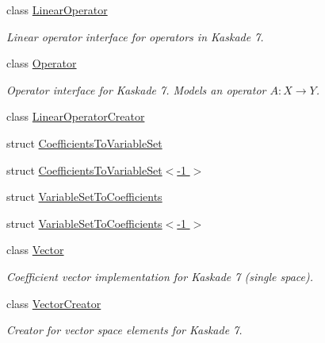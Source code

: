 \begin{DoxyCompactItemize}
class \hyperlink{classSpacy_1_1Kaskade_1_1LinearOperator}{\-Linear\-Operator}
\begin{DoxyCompactList}\small\item\em \-Linear operator interface for operators in \-Kaskade 7. \end{DoxyCompactList}\item 
class \hyperlink{classSpacy_1_1Kaskade_1_1Operator}{\-Operator}
\begin{DoxyCompactList}\small\item\em \-Operator interface for \-Kaskade 7. \-Models an operator $A:X\rightarrow Y$. \end{DoxyCompactList}\item 
class \hyperlink{classSpacy_1_1Kaskade_1_1LinearOperatorCreator}{\-Linear\-Operator\-Creator}
\item 
struct \hyperlink{structSpacy_1_1Kaskade_1_1CoefficientsToVariableSet}{\-Coefficients\-To\-Variable\-Set}
\item 
struct \hyperlink{structSpacy_1_1Kaskade_1_1CoefficientsToVariableSet_3-1_01_4}{\-Coefficients\-To\-Variable\-Set$<$-\/1 $>$}
\item 
struct \hyperlink{structSpacy_1_1Kaskade_1_1VariableSetToCoefficients}{\-Variable\-Set\-To\-Coefficients}
\item 
struct \hyperlink{structSpacy_1_1Kaskade_1_1VariableSetToCoefficients_3-1_01_4}{\-Variable\-Set\-To\-Coefficients$<$-\/1 $>$}
\item 
class \hyperlink{classSpacy_1_1Kaskade_1_1Vector}{\-Vector}
\begin{DoxyCompactList}\small\item\em \-Coefficient vector implementation for \-Kaskade 7 (single space). \end{DoxyCompactList}\item 
class \hyperlink{classSpacy_1_1Kaskade_1_1VectorCreator}{\-Vector\-Creator}
\begin{DoxyCompactList}\small\item\em \-Creator for vector space elements for \-Kaskade 7. \end{DoxyCompactList}\end{DoxyCompactItemize}
